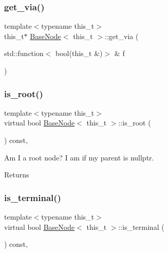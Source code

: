 \subsubsection{\texorpdfstring{get\+\_\+via()}{get\_via()}}
{\footnotesize\ttfamily template$<$typename this\+\_\+t$>$ \\
this\+\_\+t$\ast$ \hyperlink{class_base_node}{Base\+Node}$<$ this\+\_\+t $>$\+::get\+\_\+via (\begin{DoxyParamCaption}\item[{std\+::function$<$ bool(this\+\_\+t \&)$>$ \&}]{f }\end{DoxyParamCaption})\hspace{0.3cm}{\ttfamily [inline]}}

\mbox{\label{class_base_node_afce604388d562d347fcb31aeb2a8ef03}} 
\subsubsection{\texorpdfstring{is\+\_\+root()}{is\_root()}}
{\footnotesize\ttfamily template$<$typename this\+\_\+t$>$ \\
virtual bool \hyperlink{class_base_node}{Base\+Node}$<$ this\+\_\+t $>$\+::is\+\_\+root (\begin{DoxyParamCaption}{ }\end{DoxyParamCaption}) const\hspace{0.3cm}{\ttfamily [inline]}, {\ttfamily [virtual]}}

Am I a root node? I am if my parent is nullptr. \begin{DoxyReturn}{Returns}

\end{DoxyReturn}
\mbox{\label{class_base_node_af37331cbec1b32c874138d2ae9b89745}} 
\subsubsection{\texorpdfstring{is\+\_\+terminal()}{is\_terminal()}}
{\footnotesize\ttfamily template$<$typename this\+\_\+t$>$ \\
virtual bool \hyperlink{class_base_node}{Base\+Node}$<$ this\+\_\+t $>$\+::is\+\_\+terminal (\begin{DoxyParamCaption}{ }\end{DoxyParamCaption}) const\hspace{0.3cm}{\ttfamily [inline]}, {\ttfamily [virtual]}}

